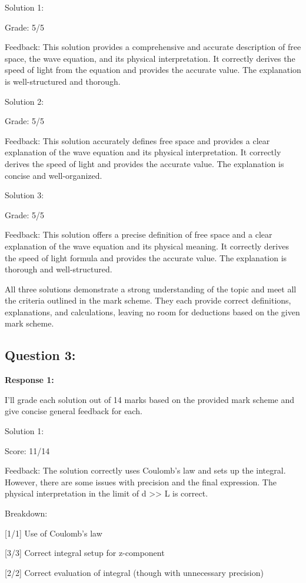 \documentclass[a4paper,11pt]{article}
\begin{document}
Solution 1:

Grade: 5/5

Feedback: This solution provides a comprehensive and accurate description of free space, the wave equation, and its physical interpretation. It correctly derives the speed of light from the equation and provides the accurate value. The explanation is well-structured and thorough.

Solution 2:

Grade: 5/5

Feedback: This solution accurately defines free space and provides a clear explanation of the wave equation and its physical interpretation. It correctly derives the speed of light and provides the accurate value. The explanation is concise and well-organized.

Solution 3:

Grade: 5/5

Feedback: This solution offers a precise definition of free space and a clear explanation of the wave equation and its physical meaning. It correctly derives the speed of light formula and provides the accurate value. The explanation is thorough and well-structured.

All three solutions demonstrate a strong understanding of the topic and meet all the criteria outlined in the mark scheme. They each provide correct definitions, explanations, and calculations, leaving no room for deductions based on the given mark scheme.

\subsection*{Question 3:}

\textbf{Response 1:}

I'll grade each solution out of 14 marks based on the provided mark scheme and give concise general feedback for each.

Solution 1:

Score: 11/14

Feedback: The solution correctly uses Coulomb's law and sets up the integral. However, there are some issues with precision and the final expression. The physical interpretation in the limit of d >> L is correct.

Breakdown:

[1/1] Use of Coulomb's law

[3/3] Correct integral setup for z-component

[2/2] Correct evaluation of integral (though with unnecessary precision)
\end{document}
